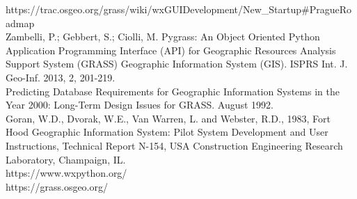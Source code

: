 \documentclass[a4paper,10pt,twoside]{article}
\begin{document}
\noindent
\large

https://trac.osgeo.org/grass/wiki/wxGUIDevelopment/New\_Startup\#PragueRoadmap \\

Zambelli, P.; Gebbert, S.; Ciolli, M. Pygrass: An Object Oriented Python Application Programming Interface (API) for Geographic Resources Analysis Support System (GRASS) Geographic Information System (GIS). ISPRS Int. J. Geo-Inf. 2013, 2, 201-219. \\

Predicting Database Requirements for Geographic Information Systems in the Year 2000: Long-Term Design Issues for GRASS. August 1992.\\

Goran, W.D., Dvorak, W.E., Van Warren, L. and Webster, R.D., 1983, Fort Hood Geographic Information System: Pilot System Development and User Instructions, Technical Report N-154, USA Construction Engineering Research Laboratory, Champaign, IL.\\

https://www.wxpython.org/\\

https://grass.osgeo.org/\\
\end{document}
